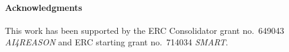 \documentclass[runningheads,a4paper,draft]{svjour3}
\begin{document}

\paragraph{Acknowledgments}\label{sect:acks}
This work has been supported by the
ERC Consolidator grant no.\ 649043 \textit{AI4REASON} and ERC starting
grant no.\ 714034 \textit{SMART}.



\end{document}
